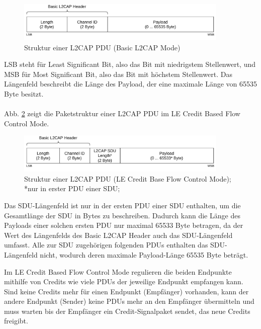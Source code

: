 \begin{figure}[H]
    \centering
    \includegraphics[width=0.9\textwidth]{graphics/l2cap_datenpaket.pdf}
    \caption[Struktur einer L2CAP PDU (Basic L2CAP Mode)]{Struktur einer L2CAP PDU (Basic L2CAP Mode) \cite{BtSpec4.2_fig_1737}}
    \label{fig: l2cap pdu basic}
\end{figure}

LSB steht für Least Significant Bit, also das Bit mit niedrigstem Stellenwert, und MSB für Most Significant Bit, also das Bit mit höchstem Stellenwert. Das Längenfeld beschreibt die Länge des Payload, der eine maximale Länge von 65535 Byte besitzt.
\\\\
Abb. \ref{fig: l2cap pdu credit} zeigt die Paketstruktur einer L2CAP PDU im LE Credit Based Flow Control Mode.

\begin{figure}
    \centering
    \includegraphics[width=0.9\textwidth]{graphics/l2cap_datenpaket_credit_based.pdf}
    \caption[Struktur einer L2CAP PDU (LE Credit Base Flow Control Mode)]{Struktur einer L2CAP PDU (LE Credit Base Flow Control Mode); *nur in erster PDU einer SDU; \cite{BtSpec4.2_fig_1747}}
    \label{fig: l2cap pdu credit}
\end{figure}

Das SDU-Längenfeld ist nur in der ersten PDU einer SDU enthalten, um die Gesamtlänge der SDU in Bytes zu beschreiben. Dadurch kann die Länge des Payloads einer solchen ersten PDU nur maximal 65533 Byte betragen, da der Wert des Längenfelds des Basic L2CAP Header auch das SDU-Längenfeld umfasst. Alle zur SDU zugehörigen folgenden PDUs enthalten das SDU-Längenfeld nicht, wodurch deren maximale Payload-Länge 65535 Byte beträgt.

Im LE Credit Based Flow Control Mode regulieren die beiden Endpunkte mithilfe von Credits wie viele PDUs der jeweilige Endpunkt empfangen kann. Sind keine Credits mehr für einen Endpunkt (Empfänger) vorhanden, kann der andere Endpunkt (Sender) keine PDUs mehr an den Empfänger übermitteln und muss warten bis der Empfänger ein Credit-Signalpaket sendet, das neue Credits freigibt. \cite{BtSpec4.2_1780}